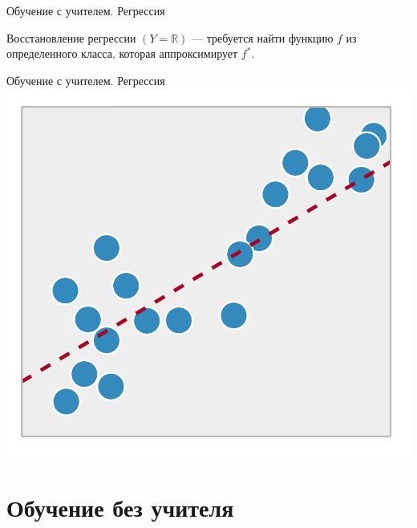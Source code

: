 \documentclass[10pt]{beamer}
\begin{document}
\begin{frame}{Обучение с учителем. Регрессия}
  \begin{center}
    Восстановление регрессии ${(Y=\mathbb{R})}$ — требуется найти функцию $f$ из определенного класса, которая аппроксимирует $f^*$.
  \end{center}
\end{frame}

\begin{frame}{Обучение с учителем. Регрессия}
  \centering
  \includegraphics[width=0.7 \linewidth, height=0.7 \textheight, keepaspectratio]{images/regression}\\
\end{frame}

\section{Обучение без учителя}
\end{document}
